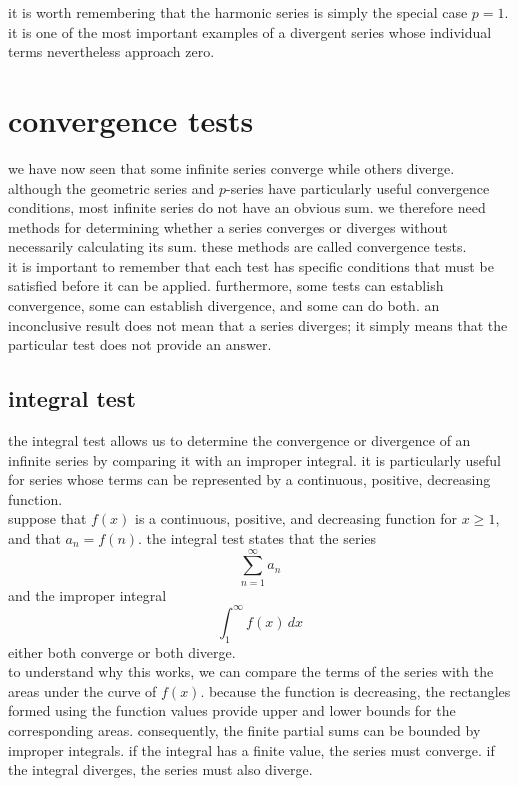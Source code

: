 \documentclass{article}
\begin{document}
it is worth remembering that the harmonic series is simply the special case $p=1$. it is one of the most important examples of a divergent series whose individual terms nevertheless approach zero.\\

\newpage

\section{convergence tests}

we have now seen that some infinite series converge while others diverge. although the geometric series and $p$-series have particularly useful convergence conditions, most infinite series do not have an obvious sum. we therefore need methods for determining whether a series converges or diverges without necessarily calculating its sum. these methods are called convergence tests.\\

it is important to remember that each test has specific conditions that must be satisfied before it can be applied. furthermore, some tests can establish convergence, some can establish divergence, and some can do both. an inconclusive result does not mean that a series diverges; it simply means that the particular test does not provide an answer.\\

\subsection{integral test}

the integral test allows us to determine the convergence or divergence of an infinite series by comparing it with an improper integral. it is particularly useful for series whose terms can be represented by a continuous, positive, decreasing function.\\

suppose that $f(x)$ is a continuous, positive, and decreasing function for $x\geq1$, and that $a_n=f(n)$. the integral test states that the series
\[
\sum_{n=1}^{\infty}a_n
\]
and the improper integral
\[
\int_1^\infty f(x)\,dx
\]
either both converge or both diverge.\\

to understand why this works, we can compare the terms of the series with the areas under the curve of $f(x)$. because the function is decreasing, the rectangles formed using the function values provide upper and lower bounds for the corresponding areas. consequently, the finite partial sums can be bounded by improper integrals. if the integral has a finite value, the series must converge. if the integral diverges, the series must also diverge.\\
\end{document}
